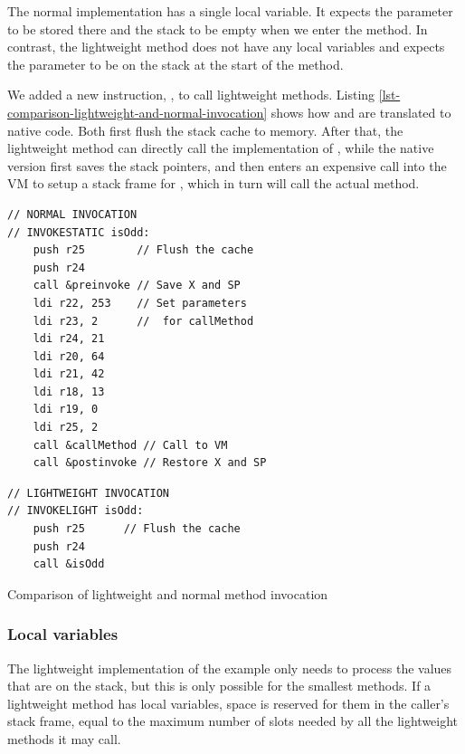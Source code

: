 The normal implementation has a single local variable. It expects the parameter to be stored there and the stack to be empty when we enter the method. In contrast, the lightweight method does not have any local variables and expects the parameter to be on the stack at the start of the method.

We added a new instruction, , to call lightweight methods. Listing \ref{lst-comparison-lightweight-and-normal-invocation} shows how  and  are translated to native code. Both first flush the stack cache to memory. After that, the lightweight method can directly call the implementation of , while the native version first saves the stack pointers, and then enters an expensive call into the VM to setup a stack frame for , which in turn will call the actual method.

\begin{listing}
\centering
\begin{minipage}[t]{0.5\textwidth}
\centering
\begin{verbatim}
// NORMAL INVOCATION
// INVOKESTATIC isOdd:
    push r25        // Flush the cache
    push r24
    call &preinvoke // Save X and SP
    ldi r22, 253    // Set parameters
    ldi r23, 2      //  for callMethod
    ldi r24, 21
    ldi r20, 64
    ldi r21, 42
    ldi r18, 13
    ldi r19, 0
    ldi r25, 2
    call &callMethod // Call to VM
    call &postinvoke // Restore X and SP
\end{verbatim}
\end{minipage}\hfill
\begin{minipage}[t]{0.45\textwidth}
\centering
\begin{verbatim}
// LIGHTWEIGHT INVOCATION
// INVOKELIGHT isOdd:
    push r25      // Flush the cache
    push r24
    call &isOdd
\end{verbatim}
\end{minipage}
\caption{Comparison of lightweight and normal method invocation}
\label{lst-comparison-lightweight-and-normal-invocation}
\end{listing}

\subsubsection{Local variables}
The lightweight implementation of the  example only needs to process the values that are on the stack, but this is only possible for the smallest methods. If a lightweight method has local variables, space is reserved for them in the caller's stack frame, equal to the maximum number of slots needed by all the lightweight methods it may call.

